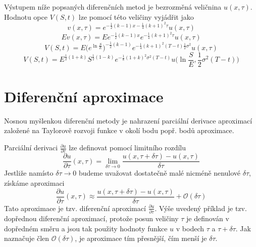 \documentclass[a4paper]{book}
\begin{document}
Výstupem níže popsaných diferenčních metod je bezrozměná veličnina $u(x, \tau)$. Hodnotu opce $V(S,t)$ lze pomocí této veličiny vyjádřit jako
\begin{equation*}
v(x, \tau) = e^{-\frac{1}{2}(k-1)x - \frac{1}{4}(k+1)^2\tau}u(x, \tau)
\end{equation*}
\begin{equation*}
Ev(x, \tau) = Ee^{-\frac{1}{2}(k-1)x} e^{-\frac{1}{4}(k+1)^2\tau}u(x, \tau)
\end{equation*}
\begin{equation*}
V(S,t) = E \Big( e^{\ln \frac{S}{E}} \Big)^{-\frac{1}{2}(k-1)}e^{-\frac{1}{4}(k+1)^2(T-t)\frac{1}{2}\sigma^2}u(x, \tau)
\end{equation*}
\begin{equation*}
V(S,t) = E^{\frac{1}{2}(1 + k)}S^{\frac{1}{2}(1 - k)}e^{-\frac{1}{8}(1+k)^2 \sigma^2(T - t)}u \Big(\ln \frac{S}{E}, \frac{1}{2} \sigma^2 (T - t) \Big)
\end{equation*}

\section{Diferenční aproximace}

Nosnou myšlenkou diferenční metody je nahrazení parciální derivace aproximací založené na Taylorově rozvoji funkce v okolí bodu popř. bodů aproximace. 

Parciální derivaci $\frac{\partial u}{\partial \tau}$ lze definovat pomocí limitního rozdílu
\begin{equation*}
\frac{\partial u}{\partial \tau}(x, \tau) = \underset{\delta \tau \rightarrow 0}{\lim} \frac{u(x, \tau + \delta \tau) - u(x, \tau)}{\delta \tau}
\end{equation*}
Jestliže namísto $\delta \tau \rightarrow 0$ budeme uvažovat dostatečně malé nicméně nenulové $\delta \tau$, získáme aproximaci
\begin{equation}
\frac{\partial u}{\partial \tau}(x, \tau) \approx \frac{u(x, \tau + \delta \tau) - u(x, \tau)}{\delta \tau} + \mathcal{O}(\delta \tau)
\end{equation}
Tato aproximace je tzv. diferenční aproximací $\frac{\partial u}{\partial \tau}$. Výše uvedený příklad je tzv. dopřednou diferenční aproximací, protože posun veličiny $\tau$ je definován v dopředném směru a jsou tak použity hodnoty funkce $u$ v bodech $\tau$ a $\tau + \delta \tau$. Jak naznačuje člen $\mathcal{O}(\delta \tau)$, je aproximace tím přesnější, čím menší je $\delta \tau$.
\end{document}

